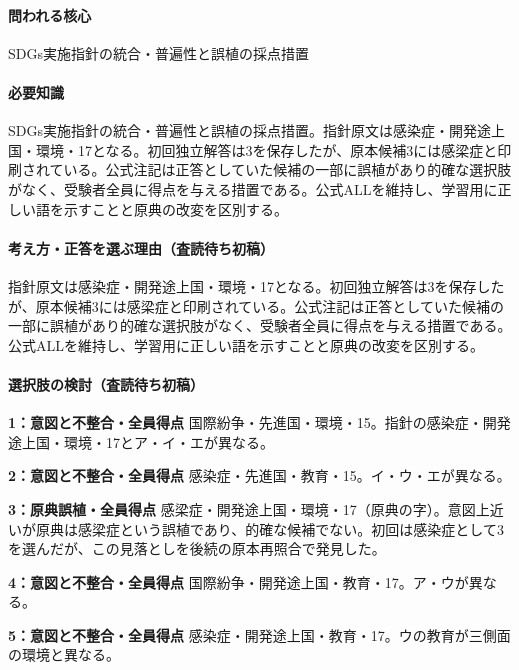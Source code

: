 \paragraph{問われる核心} SDGs実施指針の統合・普遍性と誤植の採点措置

\paragraph{必要知識} SDGs実施指針の統合・普遍性と誤植の採点措置。指針原文は感染症・開発途上国・環境・17となる。初回独立解答は3を保存したが、原本候補3には感梁症と印刷されている。公式注記は正答としていた候補の一部に誤植があり的確な選択肢がなく、受験者全員に得点を与える措置である。公式ALLを維持し、学習用に正しい語を示すことと原典の改変を区別する。

\paragraph{考え方・正答を選ぶ理由（査読待ち初稿）} 指針原文は感染症・開発途上国・環境・17となる。初回独立解答は3を保存したが、原本候補3には感梁症と印刷されている。公式注記は正答としていた候補の一部に誤植があり的確な選択肢がなく、受験者全員に得点を与える措置である。公式ALLを維持し、学習用に正しい語を示すことと原典の改変を区別する。

\paragraph{選択肢の検討（査読待ち初稿）}\mbox{}\par

\noindent\textbf{1：意図と不整合・全員得点} 国際紛争・先進国・環境・15。指針の感染症・開発途上国・環境・17とア・イ・エが異なる。\par

\noindent\textbf{2：意図と不整合・全員得点} 感染症・先進国・教育・15。イ・ウ・エが異なる。\par

\noindent\textbf{3：原典誤植・全員得点} 感梁症・開発途上国・環境・17（原典の字）。意図上近いが原典は感梁症という誤植であり、的確な候補でない。初回は感染症として3を選んだが、この見落としを後続の原本再照合で発見した。\par

\noindent\textbf{4：意図と不整合・全員得点} 国際紛争・開発途上国・教育・17。ア・ウが異なる。\par

\noindent\textbf{5：意図と不整合・全員得点} 感染症・開発途上国・教育・17。ウの教育が三側面の環境と異なる。\par

